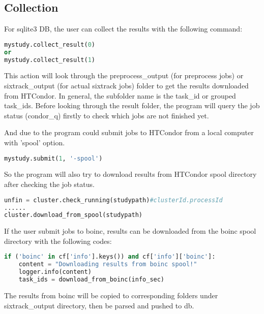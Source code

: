 \subsection{Collection}
For sqlite3 DB, the user can collect the results with the following command:
\begin{lstlisting}[language=Python]
mystudy.collect_result(0)
or
mystudy.collect_result(1)
\end{lstlisting}

This action will look through the preprocess\_output (for preprocess jobs) or sixtrack\_output (for actual sixtrack jobs) folder to get the results downloaded from HTCondor. In general, the subfolder name is the task\_id or grouped task\_ids.
Before looking through the result folder, the program will query the job status (condor\_q) firstly to check which jobs are not finished yet.

And due to the program could submit jobs to HTCondor from a local computer with 'spool' option. 
\begin{lstlisting}[language=Python]
mystudy.submit(1, '-spool')
\end{lstlisting}
So the program will also try to download results from HTCondor spool directory after checking the job status.
\begin{lstlisting}[language=Python]
unfin = cluster.check_running(studypath)#clusterId.processId
......
cluster.download_from_spool(studypath)
\end{lstlisting}

If the user submit jobs to boinc, results can be downloaded from the boinc spool directory with the following codes:
\begin{lstlisting}[language=Python]
if ('boinc' in cf['info'].keys()) and cf['info']['boinc']:
    content = "Downloading results from boinc spool!"
    logger.info(content)
    task_ids = download_from_boinc(info_sec)
\end{lstlisting}
The results from boinc will be copied to corresponding folders under sixtrack\_output directory, then be parsed and pushed to db.


%
%
